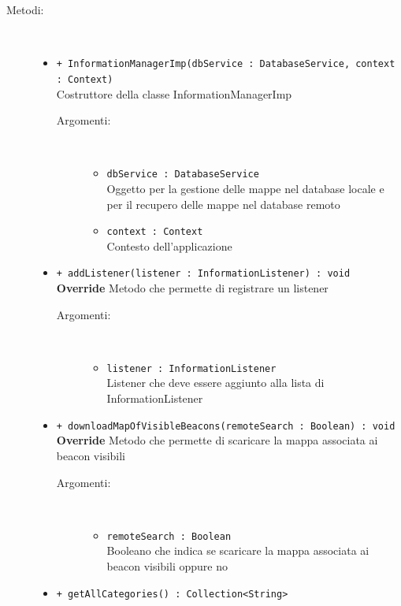 \documentclass[../DefinizioneDiProdotto.tex]{subfiles}
\begin{document}
\begin{description}
\begin{itemize}
	\end{itemize}
	\item[Metodi:] \
	\begin{itemize}
		\item \texttt{+ InformationManagerImp(dbService : DatabaseService, context : Context)}\\
		Costruttore della classe InformationManagerImp
		\begin{description}
			\item[Argomenti:] \
			\begin{itemize}
				\item \texttt{dbService : DatabaseService}\\
				Oggetto per la gestione delle mappe nel database locale e per il recupero delle mappe nel database remoto\item \texttt{context : Context}\\
				Contesto dell'applicazione\end{itemize}
		\end{description}
		\item \texttt{+ addListener(listener : InformationListener) : void}\\
		\textbf{Override} Metodo che permette di registrare un listener
		\begin{description}
			\item[Argomenti:] \
			\begin{itemize}
				\item \texttt{listener : InformationListener}\\
				Listener che deve essere aggiunto alla lista di InformationListener\end{itemize}
		\end{description}
		\item \texttt{+ downloadMapOfVisibleBeacons(remoteSearch : Boolean) : void}\\
		\textbf{Override} Metodo che permette di scaricare la mappa associata ai beacon visibili
		\begin{description}
			\item[Argomenti:] \
			\begin{itemize}
				\item \texttt{remoteSearch : Boolean}\\
				Booleano che indica se scaricare la mappa associata ai beacon visibili oppure no	\end{itemize}
		\end{description}
		\item \texttt{+ getAllCategories() : Collection<String>}\\

\end{itemize}
\end{description}
\end{document}
